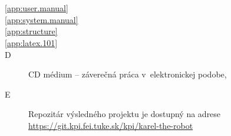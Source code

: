 
\chapter*{\appendixlistname}

\begin{description}

   \item[\autoref{app:user.manual}] 
   \item[\autoref{app:system.manual}] 
   \item[\autoref{app:structure}] 
   \item[\autoref{app:latex.101}] 
   \item[\appendixname{} D] CD médium -- záverečná práca v~elektronickej podobe,
   \item[\appendixname{} E] Repozitár výsledného projektu je dostupný na adrese\\ \url{https://git.kpi.fei.tuke.sk/kpi/karel-the-robot}

\end{description}
